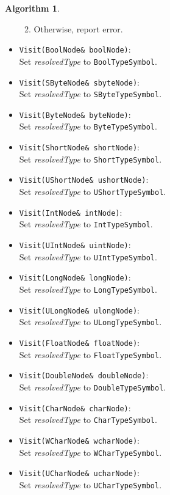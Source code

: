 \documentclass[a4paper,oneside,11pt]{book}
\theoremstyle{definition}
\newtheorem{algo}{Algorithm}[section]
\begin{document}
\begin{algo}
\begin{itemize}
\begin{enumerate}
\begin{enumerate}
\end{enumerate}
\item
Otherwise, report error.
\end{enumerate}
\item
\verb|Visit(BoolNode& boolNode)|:\\
Set \emph{resolvedType} to \verb|BoolTypeSymbol|.
\item
\verb|Visit(SByteNode& sbyteNode)|:\\
Set \emph{resolvedType} to \verb|SByteTypeSymbol|.
\item
\verb|Visit(ByteNode& byteNode)|:\\
Set \emph{resolvedType} to \verb|ByteTypeSymbol|.
\item
\verb|Visit(ShortNode& shortNode)|:\\
Set \emph{resolvedType} to \verb|ShortTypeSymbol|.
\item
\verb|Visit(UShortNode& ushortNode)|:\\
Set \emph{resolvedType} to \verb|UShortTypeSymbol|.
\item
\verb|Visit(IntNode& intNode)|:\\
Set \emph{resolvedType} to \verb|IntTypeSymbol|.
\item
\verb|Visit(UIntNode& uintNode)|:\\
Set \emph{resolvedType} to \verb|UIntTypeSymbol|.
\item
\verb|Visit(LongNode& longNode)|:\\
Set \emph{resolvedType} to \verb|LongTypeSymbol|.
\item
\verb|Visit(ULongNode& ulongNode)|:\\
Set \emph{resolvedType} to \verb|ULongTypeSymbol|.
\item
\verb|Visit(FloatNode& floatNode)|:\\
Set \emph{resolvedType} to \verb|FloatTypeSymbol|.
\item
\verb|Visit(DoubleNode& doubleNode)|:\\
Set \emph{resolvedType} to \verb|DoubleTypeSymbol|.
\item
\verb|Visit(CharNode& charNode)|:\\
Set \emph{resolvedType} to \verb|CharTypeSymbol|.
\item
\verb|Visit(WCharNode& wcharNode)|:\\
Set \emph{resolvedType} to \verb|WCharTypeSymbol|.
\item
\verb|Visit(UCharNode& ucharNode)|:\\
Set \emph{resolvedType} to \verb|UCharTypeSymbol|.

\end{itemize}
\end{algo}
\end{document}
